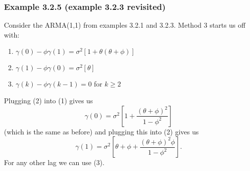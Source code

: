 \documentclass{beamer}
\begin{document}
% 
% 
% 
% 

% 
% 
% 
% 


\begin{frame}
\frametitle{Example 3.2.5 (example 3.2.3 revisited)}

Consider the ARMA(1,1) from examples 3.2.1 and 3.2.3. Method 3 starts us off with:
\begin{enumerate}
\item $\gamma(0) - \phi \gamma(1) = \sigma^2[1 + \theta (\theta + \phi)]$
\item $\gamma(1) - \phi \gamma(0) = \sigma^2[\theta]$
\item $\gamma(k) - \phi \gamma(k-1) = 0$ for $k \ge 2$
\end{enumerate}
Plugging (2) into (1) gives us
\[
\gamma(0) = \sigma^2\left[ 1 + \frac{(\theta+\phi)^2 }{1 - \phi^2 } \right]
\]
(which is the same as before) and plugging this into (2) gives us
\[
\gamma(1) = \sigma^2\left[ \theta + \phi + \frac{(\theta+\phi)^2\phi }{1 - \phi^2 } \right].
\]
For any other lag we can use (3).
\end{frame}
\end{document}

